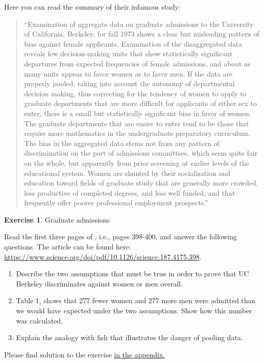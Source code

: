 \documentclass[
  12pt,
  oneside]{book}
\providecommand{\tightlist}{%
  \setlength{\itemsep}{0pt}\setlength{\parskip}{0pt}}
\theoremstyle{definition}
\theoremstyle{definition}
\theoremstyle{definition}
\newtheorem{exercise}{Exercise}[chapter]
\theoremstyle{definition}
\theoremstyle{remark}
\begin{document}
Here you can read the summary of their infamous study:

\begin{quote}
``Examination of aggregate data on graduate admissions to the University of California, Berkeley, for fall 1973 shows a clear but misleading pattern of bias against female applicants. Examination of the disaggregated data reveals few decision-making units that show statistically significant departures from expected frequencies of female admissions, and about as many units appear to favor women as to favor men. If the data are properly pooled, taking into account the autonomy of departmental decision making, thus correcting for the tendency of women to apply to graduate departments that are more difficult for applicants of either sex to enter, there is a small but statistically significant bias in favor of women. The graduate departments that are easier to enter tend to be those that require more mathematics in the undergraduate preparatory curriculum. The bias in the aggregated data stems not from any pattern of discrimination on the part of admissions committees, which seem quite fair on the whole, but apparently from prior screening at earlier levels of the educational system. Women are shunted by their socialization and education toward fields of graduate study that are generally more crowded, less productive of completed degrees, and less well funded, and that frequently offer poorer professional employment prospects.''
\end{quote}

\begin{exercise}
\protect\hypertarget{exr:graduateadmission}{}\label{exr:graduateadmission}Graduate admissions

Read the first three pages of \citet{Bickel1975Sex}, i.e., pages 398-400, and answer the following questions. The article can be found here: \url{https://www.science.org/doi/pdf/10.1126/science.187.4175.398}.

\begin{enumerate}
\def\labelenumi{\alph{enumi})}
\tightlist
\item
  Describe the two assumptions that must be true in order to prove that UC Berkeley discriminates against women or men overall.
\item
  Table 1, shows that 277 fewer women and 277 more men were admitted than we would have expected under the two assumptions. Show how this number was calculated.
\item
  Explain the analogy with fish that illustrates the danger of pooling data.
\end{enumerate}

Please find solution to the exercise \protect\hyperlink{sol:graduateadmission}{in the appendix.}
\end{exercise}
\end{document}
